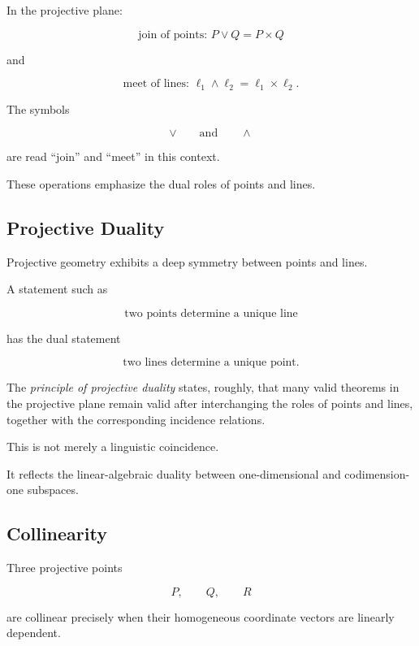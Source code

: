 In the projective plane:

\[
\boxed{
\text{join of points: }
P\vee Q=P\times Q
}
\]

and

\[
\boxed{
\text{meet of lines: }
\ell_1\wedge\ell_2=\ell_1\times\ell_2.
}
\]

The symbols

\[
\vee
\qquad\text{and}\qquad
\wedge
\]

are read ``join'' and ``meet'' in this context.

These operations emphasize the dual roles of points and lines.

\subsection{Projective Duality}
\label{subsec:projective-duality}

Projective geometry exhibits a deep symmetry between points and lines.

A statement such as

\[
\text{two points determine a unique line}
\]

has the dual statement

\[
\text{two lines determine a unique point}.
\]

\begin{importantbox}
The \emph{principle of projective duality} states, roughly, that many valid
theorems in the projective plane remain valid after interchanging the roles
of points and lines, together with the corresponding incidence relations.
\end{importantbox}

This is not merely a linguistic coincidence.

It reflects the linear-algebraic duality between one-dimensional and
codimension-one subspaces.

\subsection{Collinearity}
\label{subsec:projective-collinearity}

Three projective points

\[
P,\qquad Q,\qquad R
\]

are collinear precisely when their homogeneous coordinate vectors are
linearly dependent.

